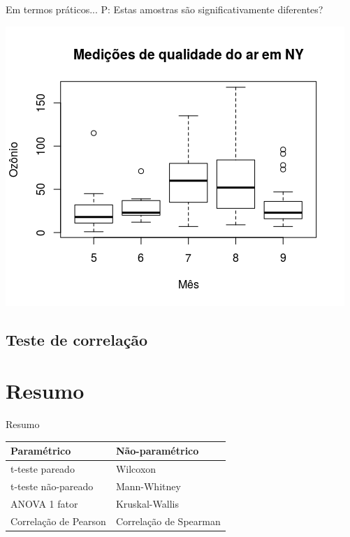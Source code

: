 \documentclass{beamer}
\begin{document}
\begin{frame}{Em termos práticos...}
P: Estas amostras são significativamente diferentes?

  \centering
  \includegraphics[height=.9\textheight]{Nao_Param/3samples-bp}
\end{frame}

\subsection[Correlação]{Teste de correlação}

\section{Resumo}

\begin{frame}{Resumo}
  \begin{tabular}{||l||l||}
    \hline
    Paramétrico & Não-paramétrico\\
    \hline
    \hline
    t-teste pareado & Wilcoxon\\
    \hline
    t-teste não-pareado & Mann-Whitney\\
    \hline
    ANOVA 1 fator & Kruskal-Wallis\\
    \hline
    Correlação de Pearson & Correlação de Spearman\\
    \hline
  \end{tabular}

\end{frame}
\end{document}
